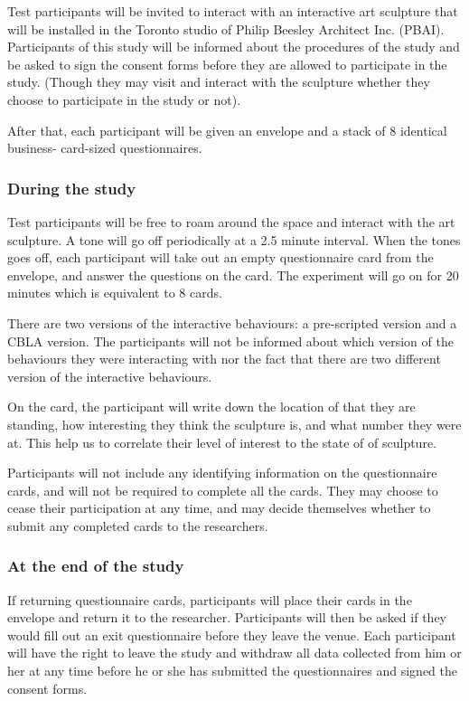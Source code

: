 Test participants will be invited to interact with an interactive art sculpture that will be
installed in the Toronto studio of Philip Beesley Architect Inc. (PBAI). Participants of this study will be informed about the procedures of the study and be asked to sign the consent forms before they are allowed to participate in the study. (Though they may visit and interact with the sculpture whether they choose to participate in the study or not).

After that, each participant will be given an envelope and a stack of 8 identical business-
card-sized questionnaires. 


\subsubsection{During the study}

Test participants will be free to roam around the space and interact with the art sculpture. A tone will go off periodically at a 2.5 minute interval. When the tones goes off, each participant will take out an empty questionnaire card from the envelope, and answer the questions on the card. The experiment will go on for 20 minutes which is equivalent to 8 cards. 

There are two versions of the interactive behaviours: a pre-scripted version and a CBLA
version. The participants will not be informed about which version of the behaviours they
were interacting with nor the fact that there are two different version of the interactive
behaviours. 

On the card, the participant will write down the location of that they are standing, how interesting they think the sculpture is, and what number they were at. This help us to correlate their level of interest to the state of of sculpture.

Participants will not include any identifying information on the questionnaire cards, and will not be required to complete all the cards. They may choose to cease their participation at any time, and may decide themselves whether to submit any completed cards to the researchers.

\subsubsection{At the end of the study}

If returning questionnaire cards, participants will place their cards in the envelope and return it to the researcher. Participants will then be asked if they would fill out an exit questionnaire before they leave the venue. Each participant will have the right to leave the study and withdraw all data collected from him or her at any time before he or she has submitted the questionnaires and signed the consent forms. 

